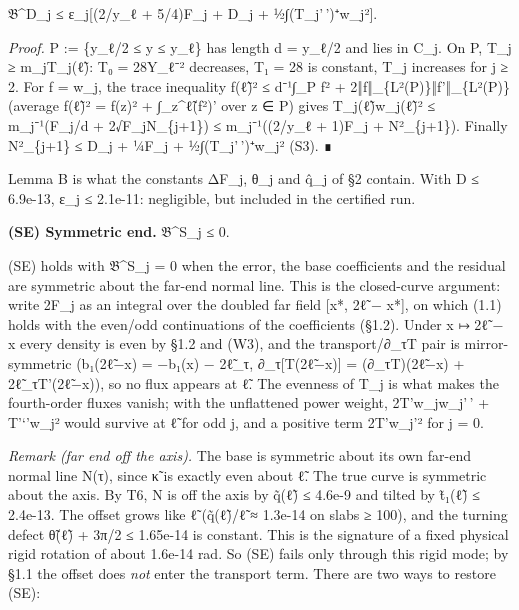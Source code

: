\documentclass[
]{article}
\begin{document}
\textbar 𝔅\^{}D\_j\textbar{} ≤ ε\_j{[}(2/y\_ℓ + 5/4)F\_j + D\_j +
½∫(T\_j'\,')⁺w\_j²{]}.

\emph{Proof.} P := \{y\_ℓ/2 ≤ y ≤ y\_ℓ\} has length d = y\_ℓ/2 and lies
in C\_j. On P, T\_j ≥ m\_jT\_j(ℓ̃): T₀ = 28Y\_ℓ⁻² decreases, T₁ = 28 is
constant, T\_j increases for j ≥ 2. For f = w\_j, the trace inequality
f(ℓ̃)² ≤ d⁻¹∫\_P f² + 2‖f‖\_\{L²(P)\}‖f'‖\_\{L²(P)\} (average f(ℓ̃)² =
f(z)² + ∫\_z\^{}ℓ̃(f²)' over z ∈ P) gives T\_j(ℓ̃)w\_j(ℓ̃)² ≤ m\_j⁻¹(F\_j/d
+ 2√F\_jN\_\{j+1\}) ≤ m\_j⁻¹((2/y\_ℓ + 1)F\_j + N²\_\{j+1\}). Finally
N²\_\{j+1\} ≤ D\_j + ¼F\_j + ½∫(T\_j'\,')⁺w\_j² (S3). ∎

Lemma B is what the constants ΔF\_j, θ\_j and q̂\_j of §2 contain. With
\textbar D\textbar{} ≤ 6.9e-13, ε\_j ≤ 2.1e-11: negligible, but included
in the certified run.

\textbf{(SE) Symmetric end.} 𝔅\^{}S\_j ≤ 0.

(SE) holds with 𝔅\^{}S\_j = 0 when the error, the base coefficients and
the residual are symmetric about the far-end normal line. This is the
closed-curve argument: write 2F\_j as an integral over the doubled far
field {[}x*, 2ℓ̃ − x*{]}, on which (1.1) holds with the even/odd
continuations of the coefficients (§1.2). Under x ↦ 2ℓ̃ − x every density
is even by §1.2 and (W3), and the transport/∂\_τT pair is
mirror-symmetric (b₁(2ℓ̃−x) = −b₁(x) − 2ℓ̃\_τ, ∂\_τ{[}T(2ℓ̃−x){]} =
(∂\_τT)(2ℓ̃−x) + 2ℓ̃\_τT'(2ℓ̃−x)), so no flux appears at ℓ̃. The evenness of
T\_j is what makes the fourth-order fluxes vanish; with the unflattened
power weight, 2T'w\_jw\_j'\,' + T'`'w\_j² would survive at ℓ̃ for odd j,
and a positive term 2\textbar T'\textbar w\_j'² for j = 0.

\emph{Remark (far end off the axis).} The base is symmetric about its
own far-end normal line N(τ), since κ̃ is exactly even about ℓ̃. The true
curve is symmetric about the axis. By T6, N is off the axis by
\textbar q̃(ℓ̃)\textbar{} ≤ 4.6e-9 and tilted by \textbar t̃₁(ℓ̃)\textbar{}
≤ 2.4e-13. The offset grows like ℓ̃ (q̃(ℓ̃)/ℓ̃ ≈ 1.3e-14 on slabs ≥ 100),
and the turning defect θ̃(ℓ̃) + 3π/2 ≤ 1.65e-14 is constant. This is the
signature of a fixed physical rigid rotation of about 1.6e-14 rad. So
(SE) fails only through this rigid mode; by §1.1 the offset does
\emph{not} enter the transport term. There are two ways to restore (SE):
\end{document}
